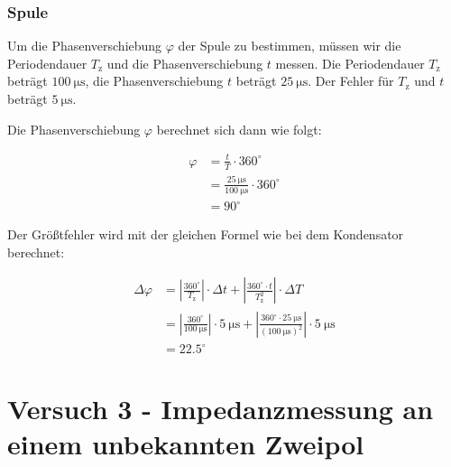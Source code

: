         \subsubsection{Spule}
            
            Um die Phasenverschiebung $\varphi$ der Spule zu bestimmen, müssen wir die Periodendauer $T_{\mathrm{z}}$ und die Phasenverschiebung $t$ messen.
            Die Periodendauer $T_{\mathrm{z}}$ beträgt $100\ \mathrm{\mu s}$, die Phasenverschiebung $t$ beträgt $25\ \mathrm{\mu s}$. Der Fehler für $T_{\mathrm{z}}$ und $t$ beträgt $5\ \mathrm{\mu s}$.

            Die Phasenverschiebung $\varphi$ berechnet sich dann wie folgt:

            \begin{equation}
                \begin{aligned}
                    \varphi &= \frac{t}{T} \cdot 360^{\circ}\\
                         &= \frac{25\ \mathrm{\mu s}}{100\ \mathrm{\mu s}} \cdot 360^{\circ}\\
                         &= 90^{\circ}
                \end{aligned}
                \label{eq:Versuch2_Spule_Phasenverschiebung}
            \end{equation}

            Der Größtfehler wird mit der gleichen Formel wie bei dem Kondensator berechnet:

            \begin{equation}
                \begin{aligned}
                    \Delta \varphi &= \left|\frac{360^{\circ}}{T_{\mathrm{z}}}\right| \cdot \Delta t + \left|\frac{360^{\circ} \cdot t}{T_{\mathrm{z}}^{2}}\right| \cdot \Delta T\\
                                   &= \left|\frac{360^{\circ}}{100\ \mathrm{\mu s}}\right| \cdot 5\ \mathrm{\mu s} + \left|\frac{360^{\circ} \cdot 25\ \mathrm{\mu s}}{(100\ \mathrm{\mu s})^{2}}\right| \cdot 5\ \mathrm{\mu s}\\
                                   &= 22.5^{\circ}
                \end{aligned}
                \label{eq:Versuch2_Spule_Phasenverschiebung_Fehler}
            \end{equation}

\section{Versuch 3 - Impedanzmessung an einem unbekannten Zweipol}
    
